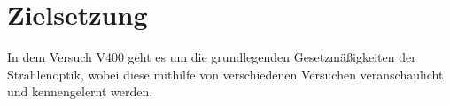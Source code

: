 \section{Zielsetzung} 

\begin{flushleft}
    In dem Versuch V400 geht es um die grundlegenden Gesetzmäßigkeiten der Strahlenoptik, wobei diese mithilfe von verschiedenen Versuchen veranschaulicht und kennengelernt werden.
\end{flushleft}